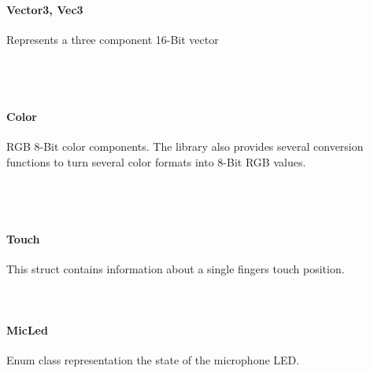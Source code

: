 \paragraph{Vector3, Vec3} Represents a three component 16-Bit vector \\

 \\

 \\

 \\

\label{APIRef_Types_color}
\paragraph{Color} RGB 8-Bit color components. The library also provides several conversion functions to turn several color formats into 8-Bit RGB values.\\

\\

\\

\\

\label{APIRef_Types_touch}
\paragraph{Touch} This struct contains information about a single fingers touch position. \\

 \\

 \\

\label{APIRef_Types_micled}
\paragraph{MicLed} Enum class representation the state of the microphone LED. \\



